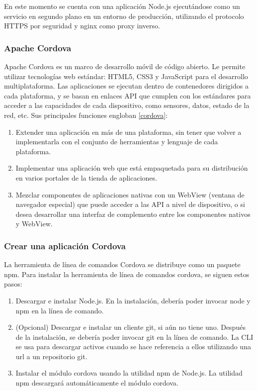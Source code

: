 En este momento se cuenta con una aplicación Node.js ejecutándose como un servicio en segundo plano en un entorno de producción, utilizando el protocolo HTTPS por seguridad y nginx como proxy inverso.


\subsubsection{Apache Cordova}
Apache Cordova es un marco de desarrollo móvil de código abierto. Le permite utilizar tecnologías web estándar: HTML5, CSS3 y JavaScript para el desarrollo multiplataforma. Las aplicaciones se ejecutan dentro de contenedores dirigidos a cada plataforma, y se basan en enlaces API que cumplen con los estándares para acceder a las capacidades de cada dispositivo, como sensores, datos, estado de la red, etc. Sus principales funciones engloban \ref{cordova}:

\begin{enumerate}
  \item Extender una aplicación en más de una plataforma, sin tener que volver a implementarla con el conjunto de herramientas y lenguaje de cada plataforma.
  \item Implementar una aplicación web que está empaquetada para su distribución en varios portales de la tienda de aplicaciones.
  \item Mezclar componentes de aplicaciones nativas con un WebView (ventana de navegador especial) que puede acceder a las API a nivel de dispositivo, o si desea desarrollar una interfaz de complemento entre los componentes nativos y WebView.
\end{enumerate}

\subsubsection{Crear una aplicación Cordova}
La herramienta de línea de comandos Cordova se distribuye como un paquete npm. Para instalar la herramienta de línea de comandos cordova, se siguen estos pasos:

\begin{enumerate}
  \item Descargar e instalar Node.js. En la instalación, debería poder invocar node y npm en la línea de comando.
  \item (Opcional) Descargar e instalar un cliente git, si aún no tiene uno. Después de la instalación, se debería poder invocar git en la línea de comando. La CLI se usa para descargar activos cuando se hace referencia a ellos utilizando una url a un repositorio git.
  \item Instalar el módulo cordova usando la utilidad npm de Node.js. La utilidad npm descargará automáticamente el módulo cordova.
\end{enumerate}


